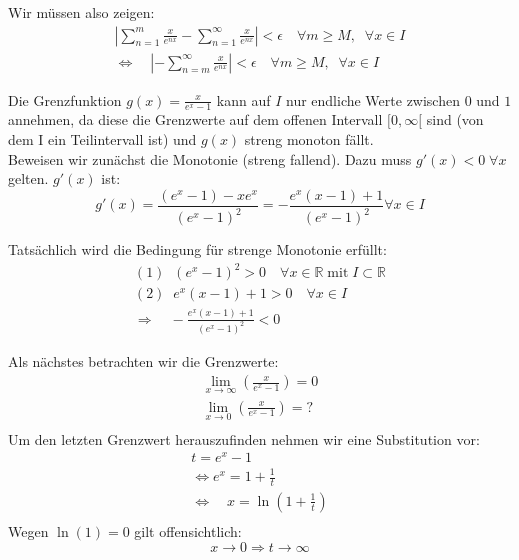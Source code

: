 \documentclass[a4paper,german,12pt,smallheadings]{scrartcl}
\begin{document}
Wir müssen also zeigen:
\begin{align*}
\left|\sum_{n=1}^{m}\frac{x}{e^{nx}}-\sum_{n=1}^{\infty}\frac{x}{e^{nx}}\right| < \epsilon \quad \forall m\geq M, \;\; \forall x \in I\\
\Leftrightarrow \quad \left|-\sum_{n=m}^{\infty}\frac{x}{e^{nx}}\right| < \epsilon \quad \forall m\geq M, \;\; \forall x \in I
\end{align*}

Die Grenzfunktion $g(x)=\frac{x}{e^x-1}$ kann auf $I$ nur endliche Werte zwischen $0$ und $1$ annehmen, da diese die Grenzwerte auf dem offenen Intervall $[0,\infty[$ sind (von dem I ein Teilintervall ist) und $g(x)$ streng monoton fällt.\\

Beweisen wir zunächst die Monotonie (streng fallend). Dazu muss $g'(x)<0 \; \forall x$ gelten. $g'(x)$ ist:
\begin{equation*}
g'(x)=\frac{(e^x-1)-xe^x}{(e^x-1)^2}=-\frac{e^x(x-1)+1}{(e^x-1)^2} \forall x\in I
\end{equation*}

Tatsächlich wird die Bedingung für strenge Monotonie erfüllt:
\begin{align*}
(1)\;\; (e^x-1)^2 > 0 \quad \forall x\in\mathbb{R}\; \text{mit}\; I\subset\mathbb{R}\\
(2)\;\; e^x(x-1)+1 > 0 \quad \forall x \in I\\
\Rightarrow \quad -\frac{e^x(x-1)+1}{(e^x-1)^2}<0
\end{align*}

Als nächstes betrachten wir die Grenzwerte:
\begin{align*}
\lim\limits_{x \to \infty}\left(\frac{x}{e^x-1}\right)=0\\
\lim\limits_{x \to 0}\left(\frac{x}{e^x-1}\right)=?\\
\end{align*}
Um den letzten Grenzwert herauszufinden nehmen wir eine Substitution vor:
\begin{align*}
t=e^x-1\\
\Leftrightarrow e^x=1+\frac{1}{t}\\
\Leftrightarrow \quad x=\ln(1+\frac{1}{t})\\
\end{align*}
Wegen $\ln(1)=0$ gilt offensichtlich:
\begin{equation*}
x\rightarrow0 \Rightarrow t\rightarrow \infty
\end{equation*}
\end{document}

